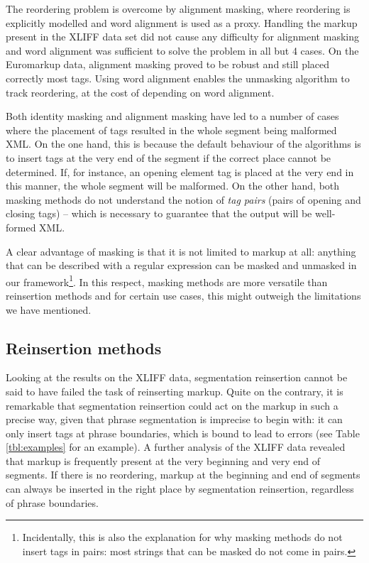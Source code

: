 \documentclass[11pt,letterpaper]{article}
\begin{document}
The reordering problem is overcome by alignment masking, where reordering is explicitly modelled and word alignment is used as a proxy. Handling the markup present in the XLIFF data set did not cause  any difficulty for alignment masking and word alignment was sufficient to solve the problem in all but 4 cases. On the Euromarkup data, alignment masking proved to be robust and still placed correctly most tags. Using word alignment enables the unmasking algorithm to track reordering, at the cost of depending on word alignment.





Both identity masking and alignment masking have led to a number of cases where the placement of tags resulted in the whole segment being malformed XML. On the one hand, this is because the default behaviour of the algorithms is to insert tags at the very end of the segment if the correct place cannot be determined. If, for instance, an opening element tag is placed at the very end in this manner, the whole segment will be malformed. On the other hand, both masking methods do not understand the notion of \textit{tag pairs} (pairs of opening and closing tags) -- which is necessary to guarantee that the output will be well-formed XML.

A clear advantage of masking is that it is not limited to markup at all: anything that can be described with a regular expression can be masked and unmasked in our framework\footnote{Incidentally, this is also the explanation for why masking methods do not insert tags in pairs: most strings that can be masked do not come in pairs.}. In this respect, masking methods are more versatile than reinsertion methods and for certain use cases, this might outweigh the limitations we have mentioned.


\subsection{Reinsertion methods}\label{sec:discussionr}

Looking at the results on the XLIFF data, segmentation reinsertion cannot be said to have failed the task of reinserting markup. Quite on the contrary, it is remarkable that segmentation reinsertion could act on the markup in such a precise way, given that phrase segmentation is imprecise to begin with: it can only insert tags at phrase boundaries, which is bound to lead to errors (see Table \ref{tbl:examples} for an example). A further analysis of the XLIFF data revealed that markup is frequently present at the very beginning and very end of segments. If there is no reordering, markup at the beginning and end of segments can always be inserted in the right place by segmentation reinsertion, regardless of phrase boundaries.
\end{document}
